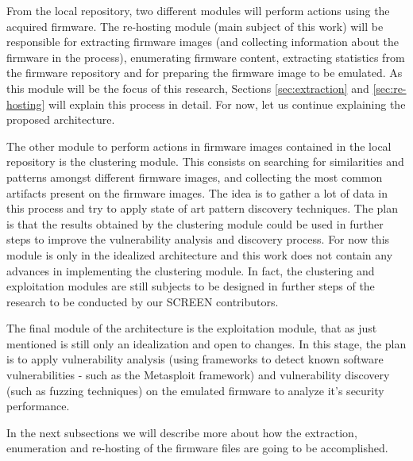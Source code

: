 From the local repository, two different modules will perform actions using the acquired firmware. The re-hosting module (main subject of this work) will be responsible for extracting firmware images (and collecting information about the firmware in the process), enumerating firmware content, extracting statistics from the firmware repository and for preparing the firmware image to be emulated. As this module will be the focus of this research, Sections \ref{sec:extraction} and \ref{sec:re-hosting} will explain this process in detail. For now, let us continue explaining the proposed architecture. 


The other module to perform actions in firmware images contained in the local repository is the clustering module. This consists on searching for similarities and patterns amongst different firmware images, and collecting the most common artifacts present on the firmware images. The idea is to gather a lot of data in this process and try to apply state of art pattern discovery techniques. The plan is that the results obtained by the clustering module could be used in further steps to improve the vulnerability analysis and discovery process. For now this module is only in the idealized architecture and this work does not contain any advances in implementing the clustering module. In fact, the clustering and exploitation modules are still subjects to be designed in further steps of the research to be conducted by our SCREEN contributors.

The final module of the architecture is the exploitation module, that as just mentioned is still only an idealization and open to changes. In this stage, the plan is to apply vulnerability analysis (using frameworks to detect known software vulnerabilities - such as the Metasploit framework) and vulnerability discovery (such as fuzzing techniques) on the emulated firmware to analyze it's security performance.

In the next subsections we will describe more about how the extraction, enumeration and re-hosting of the firmware files are going to be accomplished.

